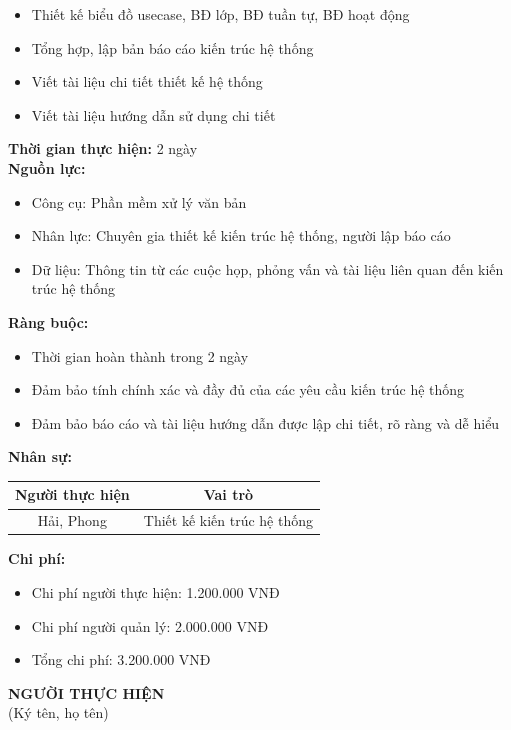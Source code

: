 {\begin{minipage}{\textwidth}
\begin{itemize}
\begin{itemize}
            \item Thiết kế biểu đồ usecase, BĐ lớp, BĐ tuần tự, BĐ hoạt động
            \item Tổng hợp, lập bản báo cáo kiến trúc hệ thống
            \item Viết tài liệu chi tiết thiết kế hệ thống
            \item Viết tài liệu hướng dẫn sử dụng chi tiết
        \end{itemize}
    \end{itemize}
    \vspace{0.5cm}
    \noindent \textbf{Thời gian thực hiện:} 2 ngày \\
    \noindent \textbf{Nguồn lực:}
    \begin{itemize}
        \item Công cụ: Phần mềm xử lý văn bản
        \item Nhân lực: Chuyên gia thiết kế kiến trúc hệ thống, người lập báo cáo
        \item Dữ liệu: Thông tin từ các cuộc họp, phỏng vấn và tài liệu liên quan đến kiến trúc hệ thống
    \end{itemize}
    \vspace{0.5cm}
    \noindent \textbf{Ràng buộc:}
    \begin{itemize}
        \item Thời gian hoàn thành trong 2 ngày
        \item Đảm bảo tính chính xác và đầy đủ của các yêu cầu kiến trúc hệ thống
        \item Đảm bảo báo cáo và tài liệu hướng dẫn được lập chi tiết, rõ ràng và dễ hiểu
    \end{itemize}
    \vspace{0.5cm}
    \noindent \textbf{Nhân sự:}
    \begin{longtable}{|c|c|}
    \hline
    \textbf{Người thực hiện} & \textbf{Vai trò} \\
    \hline
    Hải, Phong & Thiết kế kiến trúc hệ thống \\
    \hline
    \end{longtable}
    \vspace{0.5cm}
    \noindent \textbf{Chi phí:}
    \begin{itemize}
        \item Chi phí người thực hiện: 1.200.000 VNĐ
        \item Chi phí người quản lý: 2.000.000 VNĐ
        \item Tổng chi phí: 3.200.000 VNĐ
    \end{itemize}
    \vspace{1cm}
    \begin{flushleft}
        \hspace{8cm} \textbf{NGƯỜI THỰC HIỆN} \\
        \hspace{8.8cm} (Ký tên, họ tên) \\
        \vspace{1cm}
    \end{flushleft}
    \end{minipage}
}
% 
